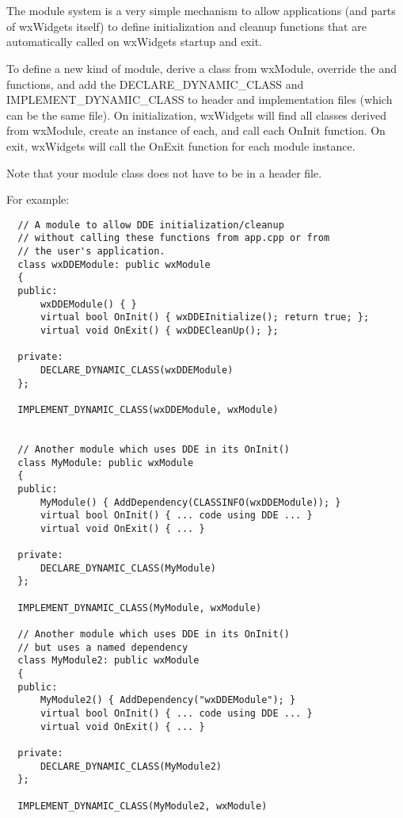 \section{}\label{wxmodule}

The module system is a very simple mechanism to allow applications (and parts
of wxWidgets itself) to define initialization and cleanup functions that are
automatically called on wxWidgets startup and exit.

To define a new kind of module, derive a class from wxModule, override the
 and  
functions, and add the DECLARE\_DYNAMIC\_CLASS and IMPLEMENT\_DYNAMIC\_CLASS to
header and implementation files (which can be the same file). On
initialization, wxWidgets will find all classes derived from wxModule, create
an instance of each, and call each OnInit function. On exit, wxWidgets will
call the OnExit function for each module instance.

Note that your module class does not have to be in a header file.

For example:

\begin{verbatim}
  // A module to allow DDE initialization/cleanup
  // without calling these functions from app.cpp or from
  // the user's application.
  class wxDDEModule: public wxModule
  {
  public:
      wxDDEModule() { }
      virtual bool OnInit() { wxDDEInitialize(); return true; };
      virtual void OnExit() { wxDDECleanUp(); };

  private:
      DECLARE_DYNAMIC_CLASS(wxDDEModule)
  };

  IMPLEMENT_DYNAMIC_CLASS(wxDDEModule, wxModule)


  // Another module which uses DDE in its OnInit()
  class MyModule: public wxModule
  {
  public:
      MyModule() { AddDependency(CLASSINFO(wxDDEModule)); }
      virtual bool OnInit() { ... code using DDE ... }
      virtual void OnExit() { ... }

  private:
      DECLARE_DYNAMIC_CLASS(MyModule)
  };

  IMPLEMENT_DYNAMIC_CLASS(MyModule, wxModule)

  // Another module which uses DDE in its OnInit()
  // but uses a named dependency
  class MyModule2: public wxModule
  {
  public:
      MyModule2() { AddDependency("wxDDEModule"); }
      virtual bool OnInit() { ... code using DDE ... }
      virtual void OnExit() { ... }

  private:
      DECLARE_DYNAMIC_CLASS(MyModule2)
  };

  IMPLEMENT_DYNAMIC_CLASS(MyModule2, wxModule)
\end{verbatim}

